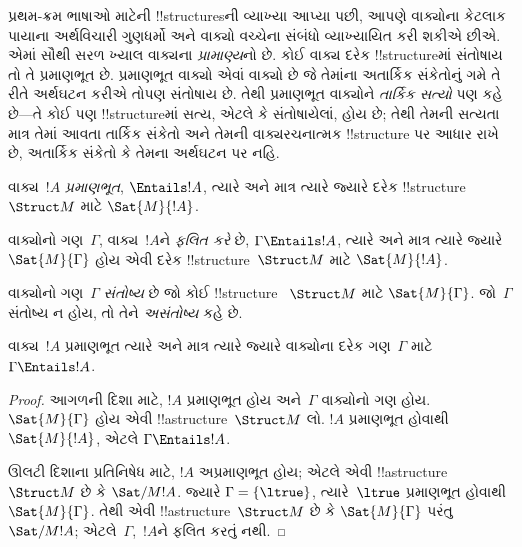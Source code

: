\documentclass[../../../include/open-logic-section]{subfiles}
\begin{document}

\begin{explain}
પ્રથમ-ક્રમ ભાષાઓ માટેની !!{structure}sની વ્યાખ્યા આપ્યા પછી, આપણે
વાક્યોના કેટલાક પાયાના અર્થવિચારી ગુણધર્મો અને વાક્યો વચ્ચેના સંબંધો
વ્યાખ્યાયિત કરી શકીએ છીએ. એમાં સૌથી સરળ ખ્યાલ વાક્યના
\emph{પ્રામાણ્ય}નો છે. કોઈ વાક્ય દરેક !!{structure}માં સંતોષાય તો તે
પ્રમાણભૂત છે. પ્રમાણભૂત વાક્યો એવાં વાક્યો છે જે તેમાંના અતાર્કિક
સંકેતોનું ગમે તે રીતે અર્થઘટન કરીએ તોપણ સંતોષાય છે. તેથી પ્રમાણભૂત
વાક્યોને \emph{તાર્કિક સત્યો} પણ કહે છે---તે કોઈ પણ !!{structure}માં
સત્ય, એટલે કે સંતોષાયેલાં, હોય છે; તેથી તેમની સત્યતા માત્ર તેમાં આવતા
તાર્કિક સંકેતો અને તેમની વાક્યરચનાત્મક !!{structure} પર આધાર રાખે છે,
અતાર્કિક સંકેતો કે તેમના અર્થઘટન પર નહિ.
\end{explain}

\begin{defn}[પ્રામાણ્ય]
વાક્ય~$!A$ \emph{પ્રમાણભૂત}, $\Entails !A$, ત્યારે અને માત્ર ત્યારે
જ્યારે દરેક !!{structure}~$\Struct M$ માટે $\Sat{M}{!A}$.
\end{defn}

\begin{defn}[ફલિતતા]
વાક્યોનો ગણ~$\Gamma$, વાક્ય~$!A$ને \emph{ફલિત કરે} છે,
$\Gamma\Entails !A$, ત્યારે અને માત્ર ત્યારે જ્યારે
$\Sat{M}{\Gamma}$ હોય એવી દરેક !!{structure}~$\Struct M$ માટે
$\Sat{M}{!A}$.
\end{defn}


\begin{defn}[સંતોષ્યતા]
વાક્યોનો ગણ~$\Gamma$ \emph{સંતોષ્ય} છે જો કોઈ !!{structure}
~$\Struct M$ માટે $\Sat{M}{\Gamma}$. જો~$\Gamma$ સંતોષ્ય ન હોય, તો તેને
\emph{અસંતોષ્ય} કહે છે.
\end{defn}

\begin{prop}
વાક્ય~$!A$ પ્રમાણભૂત ત્યારે અને માત્ર ત્યારે જ્યારે વાક્યોના દરેક
ગણ~$\Gamma$ માટે $\Gamma\Entails !A$.
\end{prop}

\begin{proof}
આગળની દિશા માટે, $!A$ પ્રમાણભૂત હોય અને~$\Gamma$ વાક્યોનો ગણ હોય.
$\Sat{M}{\Gamma}$ હોય એવી !!a{structure}~$\Struct M$ લો. $!A$
પ્રમાણભૂત હોવાથી $\Sat{M}{!A}$, એટલે $\Gamma\Entails !A$.

ઊલટી દિશાના પ્રતિનિષેધ માટે, $!A$ અપ્રમાણભૂત હોય; એટલે એવી
!!a{structure}~$\Struct M$ છે કે $\Sat/{M}{!A}$. જ્યારે
$\Gamma=\{\ltrue\}$, ત્યારે~$\ltrue$ પ્રમાણભૂત હોવાથી
$\Sat{M}{\Gamma}$. તેથી એવી !!a{structure}~$\Struct M$ છે કે
$\Sat{M}{\Gamma}$ પરંતુ $\Sat/{M}{!A}$; એટલે~$\Gamma$,~$!A$ને ફલિત
કરતું નથી.
\end{proof}
\end{document}
